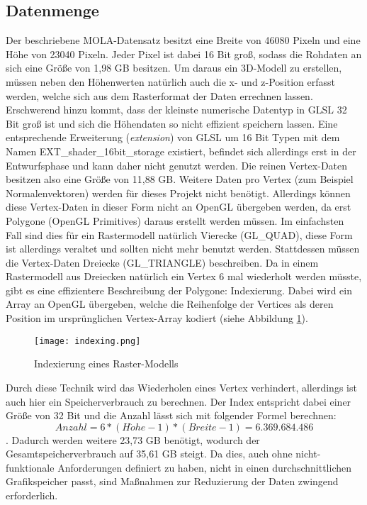 \subsection{Datenmenge}\label{datenmenge}
Der beschriebene MOLA-Datensatz besitzt eine Breite von 46080 Pixeln und eine Höhe von 23040 Pixeln. Jeder Pixel ist dabei 16 Bit groß, sodass die Rohdaten an sich eine Größe von 1,98 GB besitzen\cite{molaDataExtended}. Um daraus ein 3D-Modell zu erstellen, müssen neben den Höhenwerten natürlich auch die x- und z-Position erfasst werden, welche sich aus dem Rasterformat der Daten errechnen lassen. Erschwerend hinzu kommt, dass der kleinste numerische Datentyp in GLSL 32 Bit groß ist\cite[Abschnitt 4.1, S. 23]{glslSpec} und sich die Höhendaten so nicht effizient speichern lassen. Eine entsprechende Erweiterung (\textit{extension}) von GLSL um 16 Bit Typen mit dem Namen EXT\_shader\_16bit\_storage existiert, befindet sich allerdings erst in der Entwurfsphase und kann daher nicht genutzt werden. Die reinen Vertex-Daten besitzen also eine Größe von 11,88 GB. Weitere Daten pro Vertex (zum Beispiel Normalenvektoren) werden für dieses Projekt nicht benötigt. Allerdings können diese Vertex-Daten in dieser Form nicht an OpenGL übergeben werden, da erst Polygone (OpenGL Primitives) daraus erstellt werden müssen. Im einfachsten Fall sind dies für ein Rastermodell natürlich Vierecke (GL\_QUAD), diese Form ist allerdings veraltet und sollten nicht mehr benutzt werden. Stattdessen müssen die Vertex-Daten  Dreiecke (GL\_TRIANGLE) beschreiben. Da in einem Rastermodell aus Dreiecken natürlich ein Vertex 6 mal wiederholt werden müsste, gibt es eine effizientere Beschreibung der Polygone: Indexierung. Dabei wird ein Array an OpenGL übergeben, welche die Reihenfolge der Vertices als deren Position im ursprünglichen Vertex-Array kodiert (siehe Abbildung \ref{indexing}). 

\begin{figure}[H]
  \texttt{[image: indexing.png]}
  \caption{Indexierung eines Raster-Modells}
  \label{indexing}
\end{figure}

Durch diese Technik wird das Wiederholen eines Vertex verhindert, allerdings ist auch hier ein Speicherverbrauch zu berechnen. Der Index entspricht dabei einer Größe von 32 Bit und die Anzahl lässt sich mit folgender Formel berechnen: \[Anzahl = 6 * (H\ddot{o}he - 1) * (Breite - 1) = 6.369.684.486\]. Dadurch werden weitere 23,73 GB benötigt, wodurch der Gesamtspeicherverbrauch auf 35,61 GB steigt. Da dies, auch ohne nicht-funktionale Anforderungen definiert zu haben, nicht in einen durchschnittlichen Grafikspeicher passt, sind Maßnahmen zur Reduzierung der Daten zwingend erforderlich.

